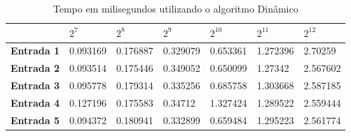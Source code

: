 \documentclass[
	12pt,				%
	oneside,   	        %
	a4paper,			%
	english,			%
	french,				%
	spanish,			%
	brazil,				%
	]{pacotes/abntex2}
\begin{document}
\begin{apendicesenv}
\begin{table}[!htb]
\centering
\caption{Tempo em milisegundos utilizando o algoritmo Dinâmico}
\label{tab:java4}
\footnotesize   %
\begin{tabular}{l|llllll}
\toprule
& \textbf{$2^7$} & \textbf{$2^8$} & \textbf{$2^9$} & \textbf{$2^{10}$} & \textbf{$2^{11}$} & \textbf{$2^{12}$}\\ 
\midrule
\textbf{Entrada 1} & 0.093169 &	0.176887 &	0.329079 & 	0.653361 & 	1.272396 & 	2.70259\\
\textbf{Entrada 2} & 0.093514 &	0.175446 &	0.349052 & 	0.650099 & 	1.27342	 & 2.567602\\
\textbf{Entrada 3} & 0.095778 &	0.179314 &	0.335256 & 	0.685758 & 	1.303668 & 	2.587185\\
\textbf{Entrada 4} & 0.127196 &	0.175583 &	0.34712	 & 1.327424	 & 1.289522	 & 2.559444\\
\textbf{Entrada 5} & 0.094372 &	0.180941 &	0.332899 & 	0.659484 & 	1.295223 & 	2.561774\\
 \bottomrule
\end{tabular}
\end{table}


\end{apendicesenv}
\newpage
\end{document}

